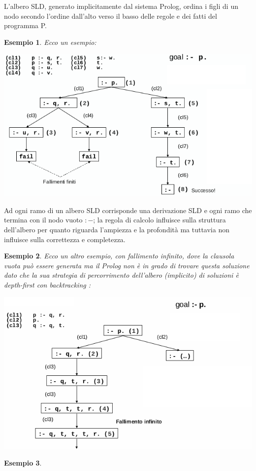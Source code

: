 \documentclass[a4paper]{report}
\newtheorem{esempio}{Esempio}
\begin{document}
L'albero SLD, generato implicitamente dal sistema Prolog, ordina i figli di un nodo secondo l'ordine dall'alto verso il basso
delle regole e dei fatti del programma P. 
\begin{esempio}
Ecco un esempio:
\begin{center}
\includegraphics[scale=0.7]{img/alb.png}
\end{center}
\end{esempio}
Ad ogni ramo di un albero SLD corrisponde una derivazione SLD e ogni ramo che termina con il nodo vuoto $:-$; la regola di calcolo
influisce sulla struttura dell'albero per quanto riguarda l'ampiezza e la profondità ma tuttavia non influisce sulla correttezza e completezza.

\begin{esempio}
  Ecco un altro esempio, con fallimento infinito, dove la clausola vuota può essere generata ma il Prolog non è in grado di trovare
  questa soluzione dato che la sua strategia di percorrimento dell’albero (implicito) di soluzioni è depth-first con backtracking :
\begin{center}
\includegraphics[scale=0.7]{img/alb2.png}
\end{center}
\end{esempio}
\begin{esempio}
\end{esempio}
\end{document}
